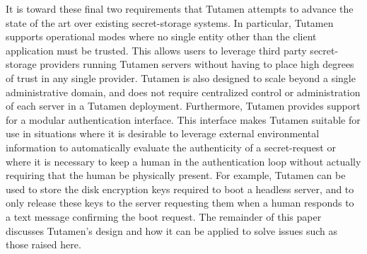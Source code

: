 It is toward these final two requirements that Tutamen attempts to
advance the state of the art over existing secret-storage systems. In
particular, Tutamen supports operational modes where no single entity
other than the client application must be trusted. This allows users
to leverage third party secret-storage providers running Tutamen
servers without having to place high degrees of trust in any single
provider. Tutamen is also designed to scale beyond a single
administrative domain, and does not require centralized control or
administration of each server in a Tutamen deployment. Furthermore,
Tutamen provides support for a modular authentication interface. This
interface makes Tutamen suitable for use in situations where it is
desirable to leverage external environmental information to
automatically evaluate the authenticity of a secret-request or where
it is necessary to keep a human in the authentication loop without
actually requiring that the human be physically present. For example,
Tutamen can be used to store the disk encryption keys required to boot
a headless server, and to only release these keys to the server
requesting them when a human responds to a text message confirming the
boot request.  The remainder of this paper discusses Tutamen's design
and how it can be applied to solve issues such as those raised here.

